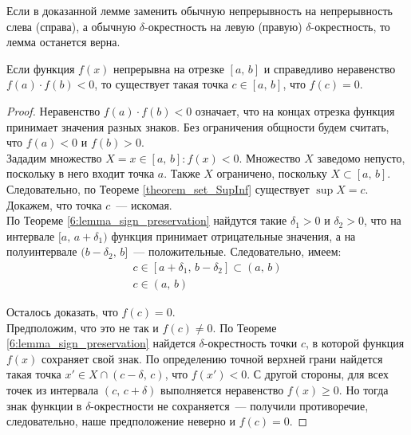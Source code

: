 \begin{note}
Если в доказанной лемме заменить обычную непрерывность на непрерывность слева (справа),
а обычную \(\delta\)-окрестность на левую (правую) \(\delta\)-окрестность,
то лемма останется верна.
\end{note}

\begin{theorem}
Если функция \(f(x)\) непрерывна на отрезке \([a, \, b]\)
и справедливо неравенство \(f(a) \cdot f(b) < 0\), то существует такая точка \(c \in [a, \, b]\),
что \(f(c) = 0\).

\begin{proof}
Неравенство \(f(a) \cdot f(b) < 0\) означает, что на концах отрезка функция принимает
значения разных знаков. Без ограничения общности будем считать, что \(f(a) < 0\) и \(f(b) > 0\). \\

Зададим множество \(X = {x \in [a, \, b]: f(x) < 0}\). Множество \(X\) заведомо непусто,
поскольку в него входит точка \(a\). Также \(X\) ограничено, поскольку \(X \subset [a, \, b]\).
Следовательно, по Теореме \ref{theorem_set_SupInf} существует \(\sup X = c\).
Докажем, что точка \(c\)~--- искомая. \\

По Теореме \ref{6:lemma_sign_preservation} найдутся такие \(\delta_{1} > 0\) и \(\delta_{2} > 0\),
что на интервале \([a, \, a + \delta_{1})\) функция принимает отрицательные значения,
а на полуинтервале \((b - \delta_{2}, \, b]\)~--- положительные.
Следовательно, имеем:
\begin{gather}
    c \in [a + \delta_{1}, \, b - \delta_{2}] \subset (a, \, b) \\
    c \in (a, \, b)
\end{gather}

Осталось доказать, что \(f(c) = 0\). \\
Предположим, что это не так и \(f(c) \neq 0\). По Теореме \ref{6:lemma_sign_preservation}
найдется \(\delta\)-окрестность точки \(c\), в которой функция \(f(x)\) сохраняет свой знак.
По определению точной верхней грани найдется такая точка \(x' \in X \cap (c - \delta, \, c)\),
что \(f(x') < 0\). С другой стороны, для всех точек из интервала \((c, \, c + \delta)\)
выполняется неравенство \(f(x) \geq 0\). Но тогда знак функции в \(\delta\)-окрестности
не сохраняется~--- получили противоречие, следовательно, наше предположение
неверно и \(f(c) = 0\).
\end{proof}
\end{theorem}


